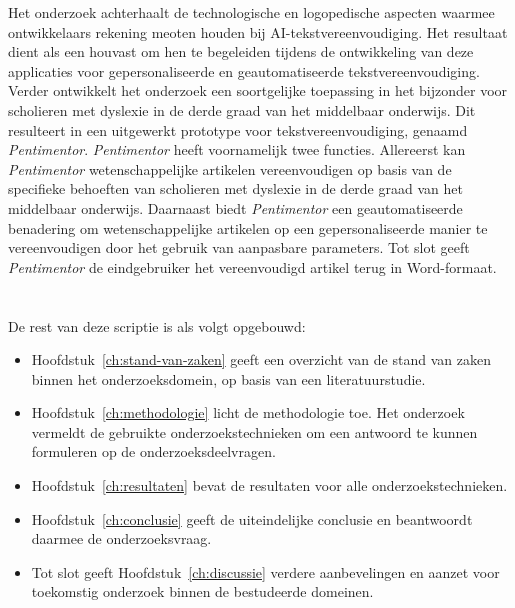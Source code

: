 Het onderzoek achterhaalt de technologische en logopedische aspecten waarmee ontwikkelaars rekening meoten houden bij AI-tekstvereenvoudiging. Het resultaat dient als een houvast om hen te begeleiden tijdens de ontwikkeling van deze applicaties voor gepersonaliseerde en geautomatiseerde tekstvereenvoudiging. Verder ontwikkelt het onderzoek een soortgelijke toepassing in het bijzonder voor scholieren met dyslexie in de derde graad van het middelbaar onderwijs. Dit resulteert in een uitgewerkt prototype voor tekstvereenvoudiging, genaamd \textit{Pentimentor}. \textit{Pentimentor} heeft voornamelijk twee functies. Allereerst kan \textit{Pentimentor} wetenschappelijke artikelen vereenvoudigen op basis van de specifieke behoeften van scholieren met dyslexie in de derde graad van het middelbaar onderwijs. Daarnaast biedt \textit{Pentimentor} een geautomatiseerde benadering om wetenschappelijke artikelen op een gepersonaliseerde manier te vereenvoudigen door het gebruik van aanpasbare parameters. Tot slot geeft \textit{Pentimentor} de eindgebruiker het vereenvoudigd artikel terug in Word-formaat. 

\section{}%
\label{sec:opzet-bachelorproef}

De rest van deze scriptie is als volgt opgebouwd:

\begin{itemize}
	\item Hoofdstuk~\ref{ch:stand-van-zaken} geeft een overzicht van de stand van zaken binnen het onderzoeksdomein, op basis van een literatuurstudie.
	\item Hoofdstuk~\ref{ch:methodologie} licht de methodologie toe. Het onderzoek vermeldt de gebruikte onderzoekstechnieken om een antwoord te kunnen formuleren op de onderzoeksdeelvragen. 
	\item Hoofdstuk~\ref{ch:resultaten} bevat de resultaten voor alle onderzoekstechnieken.
	\item Hoofdstuk~\ref{ch:conclusie} geeft de uiteindelijke conclusie en beantwoordt daarmee de onderzoeksvraag.
	\item Tot slot geeft Hoofdstuk~\ref{ch:discussie} verdere aanbevelingen en aanzet voor toekomstig onderzoek binnen de bestudeerde domeinen. 
\end{itemize}
